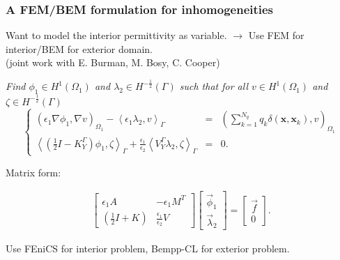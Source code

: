 \documentclass[dvipsnames,10pt]{beamer}
\begin{document}
\begin{frame} 
	\frametitle{A FEM/BEM formulation for inhomogeneities}
	
	Want to model the interior permittivity as variable. $\rightarrow$ Use FEM for interior/BEM for exterior domain.\\
	(joint work with E. Burman, M. Bosy, C. Cooper)
	
	
	\begin{center}
  \textit{Find $ \phi_1 \in H^1(\Omega_1)$ and $\lambda_2 \in H^{-\frac{1}{2}}(\Gamma)$ such that for all $v \in H^1(\Omega_1)$ and $\zeta \in H^{-\frac{1}{2}}(\Gamma)$}
\begin{equation}
\nonumber
\label{eq:standard_fem_bem}
 \left\{
 \begin{array}{rcl}
 \left(  \epsilon_1 \nabla \phi_1, \nabla v \right)_{\Omega_1}  - \left< \epsilon_1 \lambda_2, v \right>_\Gamma &=&   \left(  \sum_{k=1}^{N_q} q_k\delta(\mathbf{x},\mathbf{x}_k),  v \right)_{\Omega_1} \\[3mm]
  \left< \left(\tfrac{1}{2} I - K_{Y}^{\Gamma}\right) \phi_1, \zeta \right>_\Gamma + \tfrac{\epsilon_1}{\epsilon_2} \left< V_{Y}^{\Gamma} \lambda_2, \zeta \right>_\Gamma &=&0.
  \end{array}
  \right.
\end{equation}
\end{center}

Matrix form:

\begin{align*}
\begin{bmatrix}
\epsilon_1 A &  - \epsilon_1 M^T \\
\left(\tfrac12 I + K \right) &  \tfrac{\epsilon_1}{\epsilon_2} V
\end{bmatrix}
\begin{bmatrix}
\vec{\phi}_1 \\
\vec{\lambda}_2
\end{bmatrix}
=
\begin{bmatrix}
\vec{f} \\
0
\end{bmatrix}.
\end{align*}

Use FEniCS for interior problem, Bempp-CL for exterior problem.

\end{frame}
\end{document}
